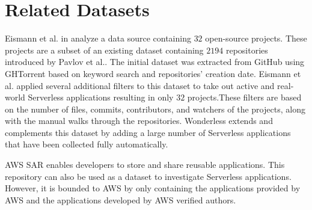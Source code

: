 \section{Related Datasets}
\label{relatedwork}

Eismann et al. in \cite{eismann2020serverless} analyze a data source 
containing $32$ open-source projects. These projects are a subset of 
an existing dataset containing $2194$ repositories introduced by 
Pavlov et al.\cite{pavlov2019serverless}. The initial dataset was extracted 
from GitHub using GHTorrent based on keyword search and repositories' 
creation date. Eismann et al. applied several additional filters to this dataset 
to take out active and real-world Serverless applications resulting in only $32$
projects.These filters are based on the number of files, commits, 
contributors, and watchers of the projects, along with the manual walks 
through the repositories. Wonderless extends and complements 
this dataset by adding a large number of Serverless applications that 
have been collected fully automatically.

AWS SAR enables developers to store and share reusable applications. 
This repository can also be used as a dataset to investigate Serverless 
applications. However, it is bounded to AWS by only containing the 
applications provided by AWS and the applications developed by 
AWS verified authors.



